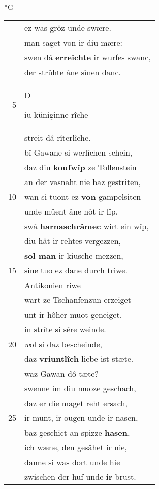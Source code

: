 \documentclass[8pt,a4paper,notitlepage]{article}
\begin{document}
\begin{table}[ht]
\begin{minipage}[t]{0.5\linewidth}
\small
\begin{center}*G
\end{center}
\begin{tabular}{rl}
 & ez was grôz unde swære.\\ 
 & man saget von ir diu mære:\\ 
 & swen dâ \textbf{erreichte} ir wurfes swanc,\\ 
 & der strûhte âne sînen danc.\\ 
5 & \begin{large}D\end{large}iu küniginne rîche\\ 
 & streit dâ rîterlîche.\\ 
 & bî Gawane si werlîchen schein,\\ 
 & daz diu \textbf{koufwîp} ze Tollenstein\\ 
 & an der vasnaht nie baz gestriten,\\ 
10 & wan si tuont ez \textbf{von} gampelsiten\\ 
 & unde müent âne nôt ir lîp.\\ 
 & swâ \textbf{harnaschrâmec} wirt ein wîp,\\ 
 & diu hât ir rehtes vergezzen,\\ 
 & \textbf{sol man} ir kiusche mezzen,\\ 
15 & sine tuo ez dane durch triwe.\\ 
 & Antikonien riwe\\ 
 & wart ze Tschanfenzun erzeiget\\ 
 & unt ir hôher muot geneiget.\\ 
 & in strîte si sêre weinde.\\ 
20 & \textit{w}ol si daz bescheinde,\\ 
 & daz \textbf{vriuntlîch} liebe ist stæte.\\ 
 & waz Gawan dô tæte?\\ 
 & swenne im diu muoze geschach,\\ 
 & daz er die maget reht ersach,\\ 
25 & ir munt, ir ougen unde ir nasen,\\ 
 & baz geschict an spizze \textbf{hasen},\\ 
 & ich wæne, den gesâhet ir nie,\\ 
 & danne si was dort unde hie\\ 
 & zwischen der huf unde \textbf{ir} brust.\\ 

\end{tabular}
\end{minipage}
\end{table}
\end{document}
